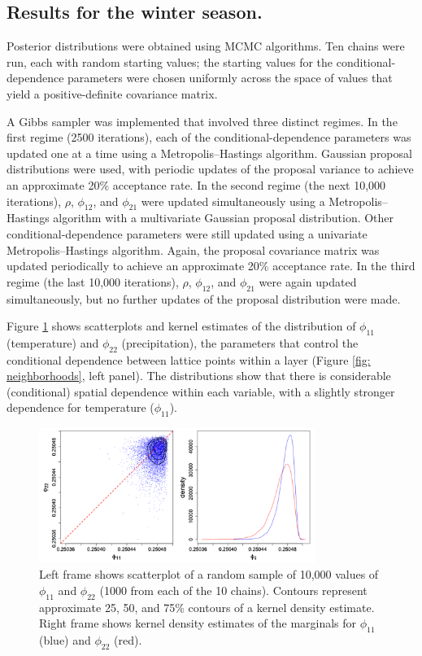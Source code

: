 \documentclass[12pt]{amsart}
\begin{document}
\subsection{Results for the winter season.} 

Posterior distributions were obtained using MCMC algorithms. Ten chains were run, each with random starting values; the starting values for the conditional-dependence parameters were chosen uniformly across the space of values that yield a positive-definite covariance matrix.

A Gibbs sampler was implemented that involved three distinct regimes. In the first regime (2500 iterations), each of the conditional-dependence parameters was updated one at a time using a Metropolis–Hastings algorithm. Gaussian proposal distributions were used, with periodic updates of the proposal variance to achieve an approximate 20\% acceptance rate. In the second regime (the next 10,000 iterations), $\rho$, $\phi_{12}$, and $\phi_{21}$ were updated simultaneously using a Metropolis–Hastings algorithm with a multivariate Gaussian proposal distribution. Other conditional-dependence parameters were still updated using a univariate Metropolis–Hastings algorithm. Again, the proposal covariance matrix was updated periodically to achieve an approximate 20\% acceptance rate. In the third regime (the last 10,000 iterations), $\rho$, $\phi_{12}$, and $\phi_{21}$ were again updated simultaneously, but no further updates of the proposal distribution were made.

Figure \ref{fig: Fig3} shows scatterplots and kernel estimates of the distribution of $\phi_{11}$ (temperature) and $\phi_{22}$ (precipitation), the parameters that control the conditional dependence between lattice points within a layer (Figure \ref{fig: neighborhoods}, left panel). The distributions show that there is considerable (conditional) spatial dependence within each variable, with a slightly stronger dependence for temperature ($\phi_{11}$).

\begin{figure}[H]
    \centering
    \includegraphics[width = 0.8\textwidth]{Fig3.png}
    \caption{Left frame shows scatterplot of a random sample of 10,000 values of $\phi_{11}$ and $\phi_{22}$ (1000 from each of the 10 chains). Contours represent approximate 25, 50, and 75\% contours of a kernel density estimate. Right frame shows kernel density estimates of the marginals for $\phi_{11}$ (blue) and $\phi_{22}$ (red).}
    \label{fig: Fig3}
\end{figure}
\end{document}
